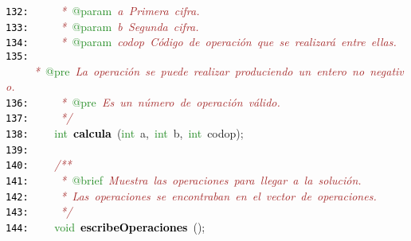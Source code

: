 \documentclass[a4paper,10pt]{scrartcl}
\begin{document}
{   \mbox{}\texttt{\textcolor{Black}{132:}} \textit{\textcolor{Brown}{\ \ \ \ \ *\ }}\textcolor{ForestGreen}{@param}\textit{\textcolor{Brown}{\ a\ Primera\ cifra.}} \\
   \mbox{}\texttt{\textcolor{Black}{133:}} \textit{\textcolor{Brown}{\ \ \ \ \ *\ }}\textcolor{ForestGreen}{@param}\textit{\textcolor{Brown}{\ b\ Segunda\ cifra.}} \\
   \mbox{}\texttt{\textcolor{Black}{134:}} \textit{\textcolor{Brown}{\ \ \ \ \ *\ }}\textcolor{ForestGreen}{@param}\textit{\textcolor{Brown}{\ codop\ Código\ de\ operación\ que\ se\ realizará\ entre\ ellas.}} \\
   \mbox{}\texttt{\textcolor{Black}{135:}} \textit{\textcolor{Brown}{\ \ \ \ \ *\ }}\textcolor{ForestGreen}{@pre}\textit{\textcolor{Brown}{\ La\ operación\ se\ puede\ realizar\ produciendo\ un\ entero\ no\ negativo.}} \\
   \mbox{}\texttt{\textcolor{Black}{136:}} \textit{\textcolor{Brown}{\ \ \ \ \ *\ }}\textcolor{ForestGreen}{@pre}\textit{\textcolor{Brown}{\ Es\ un\ número\ de\ operación\ válido.}} \\
   \mbox{}\texttt{\textcolor{Black}{137:}} \textit{\textcolor{Brown}{\ \ \ \ \ */}} \\
   \mbox{}\texttt{\textcolor{Black}{138:}} \ \ \ \ \textcolor{ForestGreen}{int}\ \textbf{\textcolor{Black}{calcula}}\ \textcolor{BrickRed}{(}\textcolor{ForestGreen}{int}\ a\textcolor{BrickRed}{,}\ \textcolor{ForestGreen}{int}\ b\textcolor{BrickRed}{,}\ \textcolor{ForestGreen}{int}\ codop\textcolor{BrickRed}{);} \\
   \mbox{}\texttt{\textcolor{Black}{139:}} \ \  \\
   \mbox{}\texttt{\textcolor{Black}{140:}} \ \ \ \ \textit{\textcolor{Brown}{/**}} \\
   \mbox{}\texttt{\textcolor{Black}{141:}} \textit{\textcolor{Brown}{\ \ \ \ \ *\ }}\textcolor{ForestGreen}{@brief}\textit{\textcolor{Brown}{\ Muestra\ las\ operaciones\ para\ llegar\ a\ la\ solución.}} \\
   \mbox{}\texttt{\textcolor{Black}{142:}} \textit{\textcolor{Brown}{\ \ \ \ \ *\ Las\ operaciones\ se\ encontraban\ en\ el\ vector\ de\ operaciones.}} \\
   \mbox{}\texttt{\textcolor{Black}{143:}} \textit{\textcolor{Brown}{\ \ \ \ \ */}} \\
   \mbox{}\texttt{\textcolor{Black}{144:}} \ \ \ \ \textcolor{ForestGreen}{void}\ \textbf{\textcolor{Black}{escribeOperaciones}}\ \textcolor{BrickRed}{();} \\
}
\end{document}
